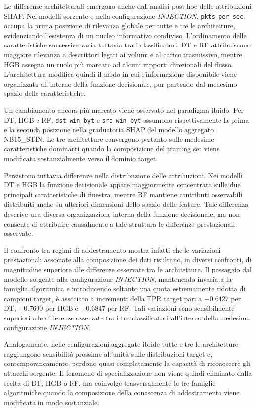 Le differenze architetturali emergono anche dall'analisi post-hoc delle attribuzioni SHAP.
Nei modelli sorgente e nella configurazione \textit{INJECTION}, \texttt{pkts\_per\_sec} occupa la prima posizione di rilevanza globale per tutte e tre le architetture, evidenziando l'esistenza di un nucleo informativo condiviso.
L'ordinamento delle caratteristiche successive varia tuttavia tra i classificatori: DT e RF attribuiscono maggiore rilevanza a descrittori legati ai volumi e al carico trasmissivo, mentre HGB assegna un ruolo più marcato ad alcuni rapporti direzionali del flusso.
L'architettura modifica quindi il modo in cui l'informazione disponibile viene organizzata all'interno della funzione decisionale, pur partendo dal medesimo spazio delle caratteristiche.

Un cambiamento ancora più marcato viene osservato nel paradigma ibrido.
Per DT, HGB e RF, \texttt{dst\_win\_byt} e \texttt{src\_win\_byt} assumono rispettivamente la prima e la seconda posizione nella graduatoria SHAP del modello aggregato NB15\_STIN.
Le tre architetture convergono pertanto sulle medesime caratteristiche dominanti quando la composizione del training set viene modificata sostanzialmente verso il dominio target.

Persistono tuttavia differenze nella distribuzione delle attribuzioni.
Nei modelli DT e HGB la funzione decisionale appare maggiormente concentrata sulle due principali caratteristiche di finestra, mentre RF mantiene contributi osservabili distribuiti anche su ulteriori dimensioni dello spazio delle feature.
Tale differenza descrive una diversa organizzazione interna della funzione decisionale, ma non consente di attribuire causalmente a tale struttura le differenze prestazionali osservate.

Il confronto tra regimi di addestramento mostra infatti che le variazioni prestazionali associate alla composizione dei dati risultano, in diversi confronti, di magnitudine superiore alle differenze osservate tra le architetture.
Il passaggio dal modello sorgente alla configurazione \textit{INJECTION}, mantenendo invariata la famiglia algoritmica e introducendo soltanto una quota estremamente ridotta di campioni target, è associato a incrementi della TPR target pari a $+0.6427$ per DT, $+0.7690$ per HGB e $+0.6847$ per RF.
Tali variazioni sono sensibilmente superiori alle differenze osservate tra i tre classificatori all'interno della medesima configurazione \textit{INJECTION}.

Analogamente, nelle configurazioni aggregate ibride tutte e tre le architetture raggiungono sensibilità prossime all'unità sulle distribuzioni target e, contemporaneamente, perdono quasi completamente la capacità di riconoscere gli attacchi sorgente.
Il fenomeno di specializzazione non viene quindi eliminato dalla scelta di DT, HGB o RF, ma coinvolge trasversalmente le tre famiglie algoritmiche quando la composizione della conoscenza di addestramento viene modificata in modo sostanziale.

